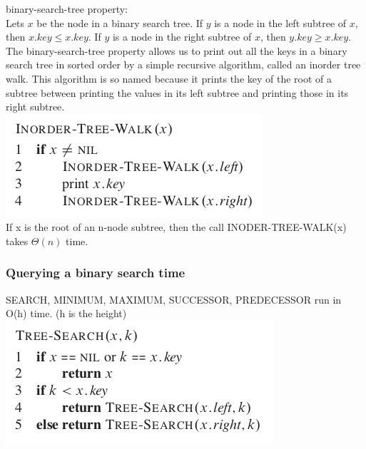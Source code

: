 \documentclass[11pt]{article}
\begin{document}
binary-search-tree property: \\
Lets $x$ be the node in a binary search tree. If $y$ is a node in the left subtree of $x$, then $x.key \le x.key$. If $y$ is a node in the right subtree of $x$, then $y.key \ge x.key$. \\

The binary-search-tree property allows us to print out all the keys in a binary search tree in sorted order by a simple recursive algorithm, called an inorder tree walk. This algorithm is so named because it prints the key of the root of a subtree between printing the values in its left subtree and printing those in its right subtree. \\


\includegraphics[width=.9\linewidth]{pics/c12_inorder_tree_walk.png} \\


If x is the root of an n-node subtree, then the call INODER-TREE-WALK(x) takes $\Theta(n)$ time. \\

\subsubsection{Querying a binary search time}
\label{sec-4-3-2}
SEARCH, MINIMUM, MAXIMUM, SUCCESSOR, PREDECESSOR run in O(h) time. (h is the height) \\

\includegraphics[width=.9\linewidth]{pics/c12_tree_search.png} \\
\end{document}
